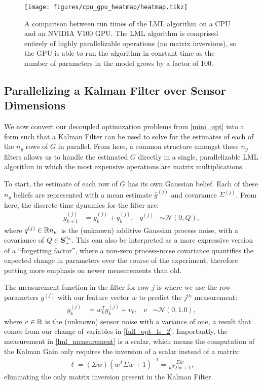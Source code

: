 \begin{figure}[t]
    \centering
    \texttt{[image: figures/cpu\_gpu\_heatmap/heatmap.tikz]}
    \caption{A comparison between run times of the LML algorithm on a CPU and an NVIDIA V100 GPU. The LML algorithm is comprised entirely of highly parallelizable operations (no matrix inversions), so the GPU is able to run the algorithm in constant time as the number of parameters in the model grows by a factor of 100.\vspace{0pt}}
    \label{fig:cpu_vs_gpu_heatmap}
\end{figure}

%
\subsection{Parallelizing a Kalman Filter over Sensor Dimensions}
%
We now convert our decoupled optimization problems from \eqref{mini_opt} into a form such that a Kalman Filter can be used to solve for the estimates of each of the $n_y$ rows of $G$ in parallel. From here, a common structure amongst these $n_y$ filters allows us to handle the estimated $G$ directly in a single, parallelizable LML algorithm in which the most expensive operations are matrix multiplications.


To start, the estimate of each row of $G$ has its own Gaussian belief. Each of these $n_y$ beliefs are represented with a mean estimate $\hat{g}^{(j)}$ and covariance $\Sigma^{(j)}$. From here,
the discrete-time dynamics for the filter are:
\begin{align}
    g^{(j)}_{k+1} &= g^{(j)}_k + q^{(j)}_k, & q^{(j)} &\sim \mathcal{N}(0, Q),\label{lml_dynamics}
\end{align}
where $q^{(j)} \in \mathbb{R}{n_w}$ is the (unknown) additive Gaussian process noise, with a covariance of $Q \in \mathbf{S}_+^{n_w}$.  This can also be interpreted as a more expressive version of a ``forgetting factor'', where a non-zero process-noise covariance quantifies the expected change in parameters over the course of the experiment, therefore putting more emphasis on newer measurements than old. 

The measurement function in the filter for row $j$ is where we use the row parameters $g^{(j)}$ with our feature vector $w$ to predict the $j^{\text{th}}$ measurement:
%
\begin{align}
    y^{(j)}_k &=  w_k^T g^{(j)}_k + v_k, & v &\sim \mathcal{N}(0, 1.0), \label{lml_measurement}
\end{align}
%
where $v \in \mathbb{R}{}$ is the (unknown) sensor noise with a variance of one, a result that comes from our change of variables in \eqref{full_opt_ls_2}. Importantly, the measurement in \eqref{lml_measurement} is a scalar, which means the computation of the Kalman Gain only requires the inversion of a scalar instead of a matrix:
%
\begin{align}
    \ell = (\Sigma w)(w^T \Sigma w + 1)^{-1} = \frac{\Sigma w}{w^T \Sigma w + 1},
\end{align}
%
eliminating the only matrix inversion present in the Kalman Filter. 

